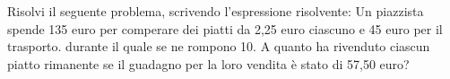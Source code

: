 \item Risolvi il seguente problema, scrivendo l'espressione risolvente: Un piazzista spende 135 euro per comperare dei piatti da 2,25 euro ciascuno e 45 euro per il trasporto. durante il quale se ne rompono 10. A quanto ha rivenduto ciascun piatto rimanente se il guadagno per la loro vendita è stato di 57,50 euro?